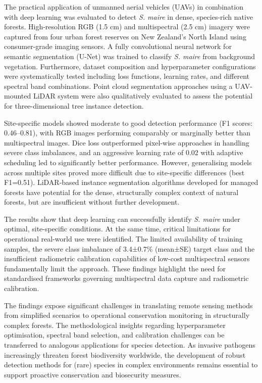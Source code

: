 \documentclass[
]{scrreprt}
\begin{document}
The practical application of unmanned aerial vehicles (UAVs) in
combination with deep learning was evaluated to detect \emph{S. maire}
in dense, species-rich native forests. High-resolution RGB (1.5 cm) and
multispectral (2.5 cm) imagery were captured from four urban forest
reserves on New Zealand's North Island using consumer-grade imaging
sensors. A fully convolutional neural network for semantic segmentation
(U-Net) was trained to classify \emph{S. maire} from background
vegetation. Furthermore, dataset composition and hyperparameter
configurations were systematically tested including loss functions,
learning rates, and different spectral band combinations. Point cloud
segmentation approaches using a UAV-mounted LiDAR system were also
qualitatively evaluated to assess the potential for three-dimensional
tree instance detection.

Site-specific models showed moderate to good detection performance (F1
scores: 0.46--0.81), with RGB images performing comparably or marginally
better than multispectral images. Dice loss outperformed pixel-wise
approaches in handling severe class imbalances, and an aggressive
learning rate of 0.02 with adaptive scheduling led to significantly
better performance. However, generalising models across multiple sites
proved more difficult due to site-specific differences (best F1=0.51).
LiDAR-based instance segmentation algorithms developed for managed
forests have potential for the dense, structurally complex context of
natural forests, but are insufficient without further development.

The results show that deep learning can successfully identify \emph{S.
maire} under optimal, site-specific conditions. At the same time,
critical limitations for operational real-world use were identified. The
limited availability of training samples, the severe class imbalance of
3.4±0.7\% (mean±SE) target class and the insufficient radiometric
calibration capabilities of low-cost multispectral sensors fundamentally
limit the approach. These findings highlight the need for standardised
frameworks governing multispectral data capture and radiometric
calibration.

The findings expose significant challenges in translating remote sensing
methods from simplified scenarios to operational conservation monitoring
in structurally complex forests. The methodological insights regarding
hyperparameter optimisation, spectral band selection, and calibration
challenges can be transferred to analogous applications for species
detection. As invasive pathogens increasingly threaten forest
biodiversity worldwide, the development of robust detection methods for
(rare) species in complex environments remains essential to support
proactive conservation and biosecurity measures.
\end{document}
